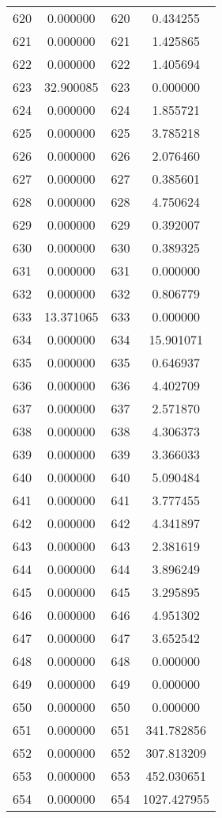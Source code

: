 \documentclass[12pt]{article}
\begin{document}
\begin{longtable}{@{}cccc@{}}
620 & 0.000000 & 620 & 0.434255 \\
621 & 0.000000 & 621 & 1.425865 \\
622 & 0.000000 & 622 & 1.405694 \\
623 & 32.900085 & 623 & 0.000000 \\
624 & 0.000000 & 624 & 1.855721 \\
625 & 0.000000 & 625 & 3.785218 \\
626 & 0.000000 & 626 & 2.076460 \\
627 & 0.000000 & 627 & 0.385601 \\
628 & 0.000000 & 628 & 4.750624 \\
629 & 0.000000 & 629 & 0.392007 \\
630 & 0.000000 & 630 & 0.389325 \\
631 & 0.000000 & 631 & 0.000000 \\
632 & 0.000000 & 632 & 0.806779 \\
633 & 13.371065 & 633 & 0.000000 \\
634 & 0.000000 & 634 & 15.901071 \\
635 & 0.000000 & 635 & 0.646937 \\
636 & 0.000000 & 636 & 4.402709 \\
637 & 0.000000 & 637 & 2.571870 \\
638 & 0.000000 & 638 & 4.306373 \\
639 & 0.000000 & 639 & 3.366033 \\
640 & 0.000000 & 640 & 5.090484 \\
641 & 0.000000 & 641 & 3.777455 \\
642 & 0.000000 & 642 & 4.341897 \\
643 & 0.000000 & 643 & 2.381619 \\
644 & 0.000000 & 644 & 3.896249 \\
645 & 0.000000 & 645 & 3.295895 \\
646 & 0.000000 & 646 & 4.951302 \\
647 & 0.000000 & 647 & 3.652542 \\
648 & 0.000000 & 648 & 0.000000 \\
649 & 0.000000 & 649 & 0.000000 \\
650 & 0.000000 & 650 & 0.000000 \\
651 & 0.000000 & 651 & 341.782856 \\
652 & 0.000000 & 652 & 307.813209 \\
653 & 0.000000 & 653 & 452.030651 \\
654 & 0.000000 & 654 & 1027.427955 \\

\end{longtable}
\end{document}
